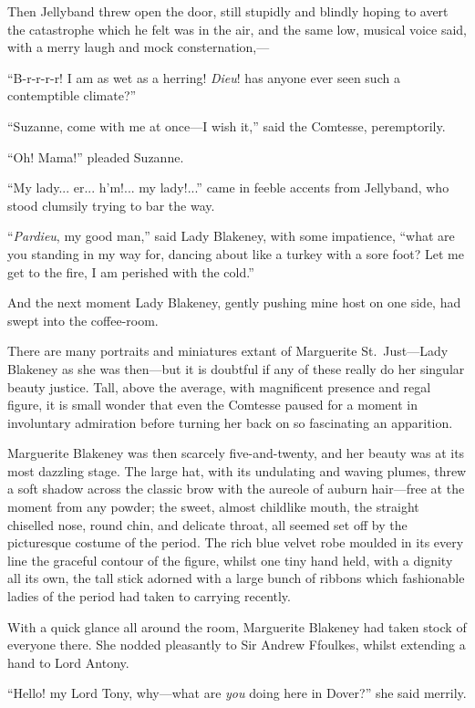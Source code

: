 \documentclass[paper=a5,BCOR=7mm,twoside,DIV=calc,12pt,usegeometry,chapterprefix,endperiod,headings=big]{scrbook}
\begin{document}
Then Jellyband threw open the door, still stupidly and blindly hoping to avert the catastrophe which he felt was in the air, and the same low, musical voice said, with a merry laugh and mock consternation,---

\enquote{B-r-r-r-r! I am as wet as a herring! \textit{Dieu}! has anyone ever seen such a contemptible climate?}

\enquote{Suzanne, come with me at once---I wish it,} said the Comtesse, peremptorily.

\enquote{Oh! Mama!} pleaded Suzanne.

\enquote{My lady... er... h'm!... my lady!...} came in feeble accents from Jellyband, who stood clumsily trying to bar the way.

\enquote{\textit{Pardieu}, my good man,} said Lady Blakeney, with some impatience, \enquote{what are you standing in my way for, dancing about like a turkey with a sore foot? Let me get to the fire, I am perished with the cold.}

And the next moment Lady Blakeney, gently pushing mine host on one side, had swept into the coffee-room.

There are many portraits and miniatures extant of Marguerite St.~Just---Lady Blakeney as she was then---but it is doubtful if any of these really do her singular beauty justice. Tall, above the average, with magnificent presence and regal figure, it is small wonder that even the Comtesse paused for a moment in involuntary admiration before turning her back on so fascinating an apparition.

Marguerite Blakeney was then scarcely five-and-twenty, and her beauty was at its most dazzling stage. The large hat, with its undulating and waving plumes, threw a soft shadow across the classic brow with the aureole of auburn hair---free at the moment from any powder; the sweet, almost childlike mouth, the straight chiselled nose, round chin, and delicate throat, all seemed set off by the picturesque costume of the period. The rich blue velvet robe moulded in its every line the graceful contour of the figure, whilst one tiny hand held, with a dignity all its own, the tall stick adorned with a large bunch of ribbons which fashionable ladies of the period had taken to carrying recently.

With a quick glance all around the room, Marguerite Blakeney had taken stock of everyone there. She nodded pleasantly to Sir Andrew Ffoulkes, whilst extending a hand to Lord Antony.

\enquote{Hello! my Lord Tony, why---what are \textit{you} doing here in Dover?} she said merrily.
\end{document}
